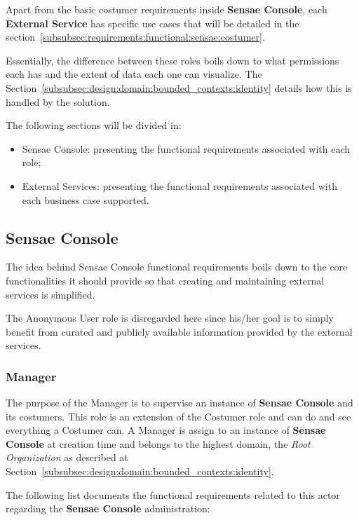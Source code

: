 Apart from the basic costumer requirements inside \textbf{Sensae Console}, each \textbf{External Service} has specific use cases that will be detailed in the section~\ref{subsubsec:requirements:functional:sensae:costumer}.

Essentially, the difference between these roles boils down to what permissions each has and the extent of data each one can visualize. The Section~\ref{subsubsec:design:domain:bounded_contexts:identity} details how this is handled by the solution.

The following sections will be divided in:

\begin{itemize}
    \item Sensae Console: presenting the functional requirements associated with each role;
    \item External Services: presenting the functional requirements associated with each business case supported.
\end{itemize}

\subsection{Sensae Console}
\label{subsec:requirements:functional:sensae}

The idea behind Sensae Console functional requirements boils down to the core functionalities it should provide so that creating and maintaining external services is simplified.

The Anonymous User role is disregarded here since his/her goal is to simply benefit from curated and publicly available information provided by the external services.

\subsubsection{Manager}
\label{subsubsec:requirements:functional:sensae:manager}

The purpose of the Manager is to supervise an instance of \textbf{Sensae Console} and its costumers. This role is an extension of the Costumer role and can do and see everything a Costumer can. A Manager is assign to an instance of \textbf{Sensae Console} at creation time and belongs to the highest domain, the \textit{Root Organization} as described at Section~\ref{subsubsec:design:domain:bounded_contexts:identity}.

The following list documents the functional requirements related to this actor regarding the \textbf{Sensae Console} administration:

